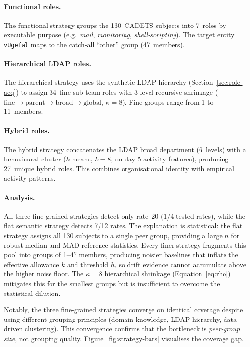 \documentclass[10pt,twocolumn]{article}
\begin{document}
\paragraph{Functional roles.}
The functional strategy groups the 130~CADETS subjects into 7~roles by
executable purpose (e.g.\ \emph{mail}, \emph{monitoring},
\emph{shell-scripting}).  The target entity \texttt{vUgefal} maps to the
catch-all ``other'' group (47~members).

\paragraph{Hierarchical LDAP roles.}
The hierarchical strategy uses the synthetic LDAP hierarchy
(Section~\ref{sec:role-acq}) to assign 34~fine sub-team roles with 3-level
recursive shrinkage ($\mathrm{fine}\to\mathrm{parent}\to\mathrm{broad}
\to\mathrm{global}$, $\kappa=8$).  Fine groups range from 1 to
11~members.

\paragraph{Hybrid roles.}
The hybrid strategy concatenates the LDAP broad department (6~levels) with
a behavioural cluster ($k$-means, $k=8$, on day-5 activity features),
producing 27~unique hybrid roles.  This combines organisational identity
with empirical activity patterns.

\paragraph{Analysis.}
All three fine-grained strategies detect only rate~20 (1/4 tested rates),
while the flat semantic strategy detects 7/12 rates.  The explanation is
statistical:
the flat strategy assigns all 130 subjects to a single peer group,
providing a large $n$ for robust median-and-MAD reference statistics.
Every finer strategy fragments this pool into groups of 1--47 members,
producing noisier baselines that inflate the effective allowance $k$ and
threshold $h$, so drift evidence cannot accumulate above the higher noise
floor.  The $\kappa=8$ hierarchical shrinkage
(Equation~\ref{eq:rho}) mitigates this for the smallest groups but is
insufficient to overcome the statistical dilution.

Notably, the three fine-grained strategies converge on identical coverage
despite using different grouping principles (domain knowledge, LDAP
hierarchy, data-driven clustering).  This convergence confirms that the
bottleneck is \emph{peer-group size}, not grouping quality.
Figure~\ref{fig:strategy-bars} visualises the coverage gap.
\end{document}
